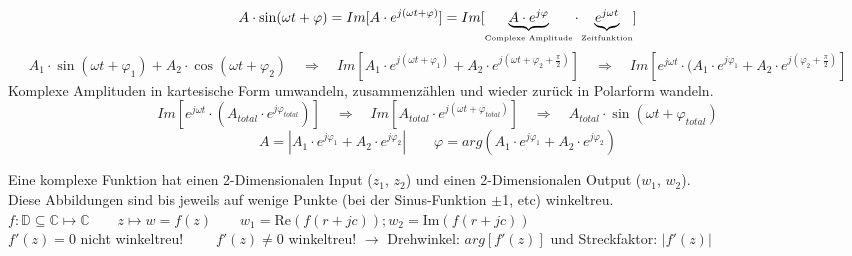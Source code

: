 $$A \cdot \sin(\omega t + \varphi) = Im[A \cdot e^{j(\omega t + \varphi)}] =
Im[\underbrace{A \cdot e^{j\varphi}}_{\text{\tiny{Complexe Amplitude}}}
\cdot \underbrace{e^{j\omega t}}_{\text{\tiny{Zeitfunktion}}}]$$
%
%
$$ A_1 \cdot \sin(\omega t + \varphi_1) + A_2 \cdot \cos(\omega t + \varphi_2) 
 \quad \Rightarrow \quad 
 Im[A_1 \cdot e^{j(\omega t + \varphi_1)} + A_2 \cdot e^{j (\omega t + \varphi_2
 + \frac{\pi}{2})}] \quad \Rightarrow \quad 
 Im[e^{j \omega t} \cdot  (A_1 \cdot e^{j \varphi_1} + A_2 \cdot e^{j (\varphi_2
 + \frac{\pi}{2})}]$$ 
Komplexe Amplituden in kartesische Form umwandeln, zusammenzählen und wieder
zurück in Polarform wandeln.
$$ Im[e^{j \omega t} \cdot  (A_{total} \cdot e^{j \varphi_{total}})] 
 \quad \Rightarrow \quad 
 Im[A_{total} \cdot e^{j (\omega t + \varphi_{total})}] 
 \quad \Rightarrow \quad 
 A_{total} \cdot \sin(\omega t + \varphi_{total})$$ 
$$A = |A_1 \cdot e^{j\varphi_1} + A_2 \cdot e^{j\varphi_2}| \qquad \varphi = arg(A_1 \cdot e^{j\varphi_1} + A_2 \cdot e^{j\varphi_2})$$


{}
Eine komplexe Funktion hat einen 2-Dimensionalen Input ($z_1$, $z_2$) und einen
2-Dimensionalen Output ($w_1$, $w_2$). \\
Diese Abbildungen sind bis jeweils auf wenige Punkte (bei der Sinus-Funktion
$\pm$1, etc) winkeltreu.\\
$ f: \mathbb{D} \subseteq \mathbb{C} \mapsto \mathbb{C} \qquad z  \mapsto w = f(z) \qquad w_1 = \text{Re}(f(r+jc)); w_2 = \text{Im}(f(r+jc))$\\$
f'(z) = 0$ nicht winkeltreu! $\qquad f'(z) \neq 0$ winkeltreu! $\rightarrow$ Drehwinkel: $arg[f'(z)]$ und Streckfaktor: $|f'(z)|$
 

